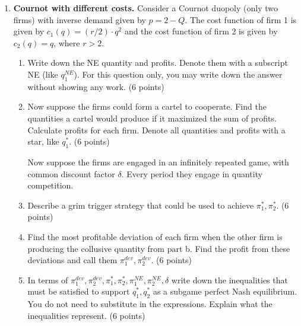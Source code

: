 \documentclass{article}
\begin{document}
\begin{enumerate}
 
     \item  \textbf{Cournot with different costs.} Consider a Cournot duopoly (only two firms) with inverse demand given by $p=2-Q$. The cost function of firm 1 is given by $c_1(q)=(r/2) \cdot q^2$ and the cost function of firm 2 is given by $c_2(q)=q$, where $r>2$.
     
     \pagebreak
     
     \begin{enumerate}
     
      \item  Write down the NE quantity and profits. Denote them with a subscript NE (like $q_1^{NE}$). For this question only, you may write down the answer without showing any work. (6 points)
      
      
      \vspace{6cm}
      
      
      \item Now suppose the firms could form a cartel to cooperate. Find the quantities a cartel would produce if it maximized the sum of profits. Calculate profits for each firm. Denote all quantities and profits with a star, like $q_1^*$. (6 points)
      
    \vspace{6cm}
    
Now suppose the firms are engaged in an infinitely repeated game, with common discount factor $\delta$. Every period they engage in quantity competition.

    \item Describe a grim trigger strategy that could be used to achieve $\pi^{*}_1, \pi^{*}_2$. (6 points)
    
   \vspace{3cm}
    
      \pagebreak
    
    \item Find the most profitable deviation of each firm when the other firm is producing the collusive quantity from part b. Find the profit from these deviations and call them $\pi_1^{dev}, \pi_2^{dev}$. (6 points)
    
    \vspace{6cm}
    
    \item In terms of $\pi_1^{dev}, \pi_2^{dev}, \pi^{*}_1, \pi^{*}_2, \pi^{NE}_1, \pi^{NE}_2, \delta$ write down the inequalities that must be satisfied to support $q_1^*, q_2^*$ as a subgame perfect Nash equilibrium. You do not need to substitute in the expressions. Explain what the inequalities represent. (6 points)
    

\end{enumerate}
\end{enumerate}
\end{document}
